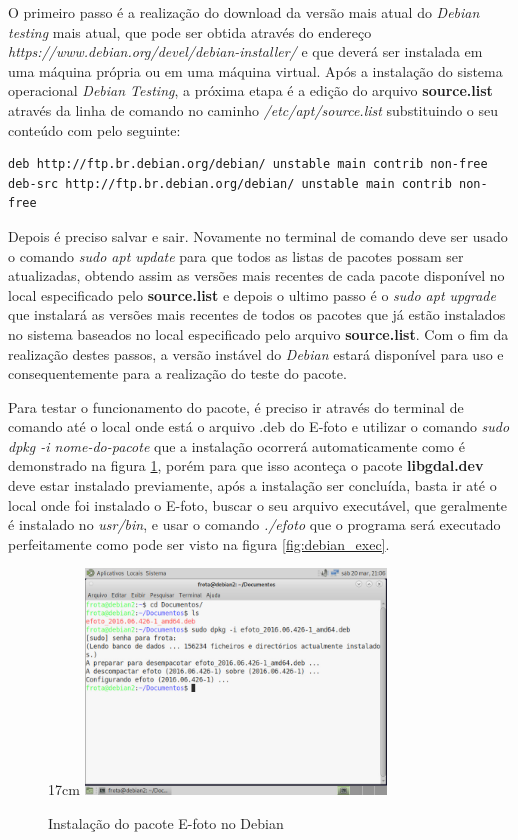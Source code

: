 O primeiro passo é a realização do download da versão mais atual do \textit{Debian testing} mais atual, que pode ser obtida através do endereço \textit{https://www.debian.org/devel/debian-installer/} e que deverá ser instalada em uma máquina própria ou em uma máquina virtual. Após a instalação do sistema operacional \textit{Debian Testing}, a próxima etapa é a edição do arquivo \textbf{source.list} através da linha de comando no caminho \textit{/etc/apt/source.list} substituindo o seu conteúdo com pelo seguinte:
 \begin{verbatim}
deb http://ftp.br.debian.org/debian/ unstable main contrib non-free	
deb-src http://ftp.br.debian.org/debian/ unstable main contrib non-free
\end{verbatim}
Depois é preciso salvar e sair. Novamente no terminal de comando deve ser usado o comando \textit{sudo apt update} para que todos as listas de pacotes possam ser atualizadas, obtendo assim as versões mais recentes de cada pacote disponível no local especificado pelo \textbf{source.list} e depois o ultimo passo é o \textit{sudo apt upgrade} que instalará as versões mais recentes de todos os pacotes que já estão instalados no sistema baseados no local especificado pelo arquivo \textbf{source.list}. Com o fim da realização destes passos, a versão instável do \textit{Debian} estará disponível para uso e consequentemente para a realização do teste do pacote.

Para testar o funcionamento do pacote, é preciso ir através do terminal de comando até o local onde está o arquivo .deb do E-foto e utilizar o comando \textit{sudo dpkg -i nome-do-pacote} que a instalação ocorrerá automaticamente como é demonstrado na figura \ref{fig:debian_insta}, porém para que isso aconteça o pacote \textbf{libgdal.dev} deve estar instalado previamente, após a instalação ser concluída, basta ir até o local onde foi instalado o E-foto, buscar o seu arquivo executável, que geralmente é instalado no \textit{usr/bin}, e usar o comando \textit{./efoto} que o programa será executado perfeitamente como pode ser visto na figura \ref{fig:debian_exec}.

\begin{figure}[!ht]{17cm}
	\centering
	\includegraphics[width=8cm]{Figuras/debian_insta.jpg}
	\caption{Instalação do pacote E-foto no Debian} \label{fig:debian_insta}
\end{figure}

